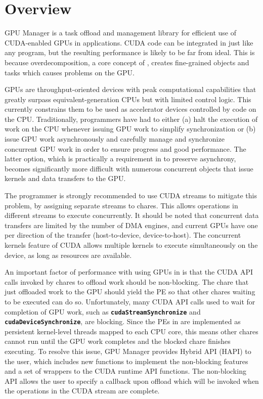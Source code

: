 \setcounter{secnumdepth}{3}

\renewcommand{\code}[1]{\texttt{\textbf{#1}}}

\newcommand{\cuda}{\code{CUDA}}

\section{Overview}

GPU Manager is a task offload and management library for efficient use of
CUDA-enabled GPUs in \charmpp{} applications. CUDA code can be integrated
in \charmpp{} just like any \CC{} program, but the resulting performance
is likely to be far from ideal. This is because overdecomposition, a core
concept of \charmpp{}, creates fine-grained objects and tasks which causes
problems on the GPU.

GPUs are throughput-oriented devices with peak computational capabilities that
greatly surpass equivalent-generation CPUs but with limited control logic. This
currently constrains them to be used as accelerator devices controlled by code
on the CPU. Traditionally, programmers have had to either (a) halt the execution
of work on the CPU whenever issuing GPU work to simplify synchronization or (b)
issue GPU work asynchronously and carefully manage and synchronize concurrent
GPU work in order to ensure progress and good performance. The latter option,
which is practically a requirement in \charmpp{} to preserve asynchrony, becomes
significantly more difficult with numerous concurrent objects that issue kernels
and data transfers to the GPU.

The \charmpp{} programmer is strongly recommended to use CUDA streams to
mitigate this problem, by assigning separate streams to chares. This allows
operations in different streams to execute concurrently. It should be noted that
concurrent data transfers are limited by the number of DMA engines, and current
GPUs have one per direction of the transfer (host-to-device, device-to-host).
The concurrent kernels feature of CUDA allows multiple kernels to execute
simultaneously on the device, as long as resources are available.

An important factor of performance with using GPUs in \charmpp{} is that the CUDA
API calls invoked by chares to offload work should be non-blocking. The chare
that just offloaded work to the GPU should yield the PE so that other chares
waiting to be executed can do so. Unfortunately, many CUDA API calls used to
wait for completion of GPU work, such as \code{cudaStreamSynchronize} and
\code{cudaDeviceSynchronize}, are blocking. Since the PEs in \charmpp{} are
implemented as persistent kernel-level threads mapped to each CPU core, this
means other chares cannot run until the GPU work completes and the blocked
chare finishes executing. To resolve this issue, GPU Manager provides Hybrid API
(HAPI) to the \charmpp{} user, which includes new functions to implement the
non-blocking features and a set of wrappers to the CUDA runtime API functions.
The non-blocking API allows the user to specify a \charmpp{} callback upon offload
which will be invoked when the operations in the CUDA stream are complete.

